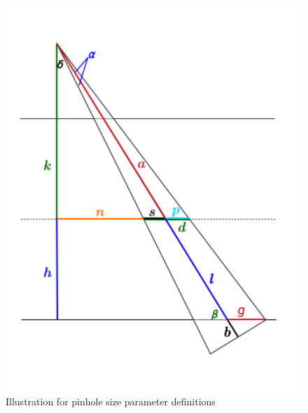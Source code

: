 \documentclass[12pt]{article}
\begin{document}
\begin{figure}[htp]
\centering
\includegraphics[scale=1]{figs/fig_def_size.pdf}
\caption{Illustration for pinhole size parameter definitions}
\label{fig:fig_def_size}
\end{figure}
\end{document}
